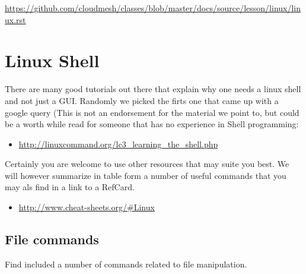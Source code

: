 \begin{fileremark}\url{https://github.com/cloudmesh/classes/blob/master/docs/source/lesson/linux/linux.rst}\end{fileremark}
\section{Linux Shell}\label{linux-shell}

There are many good tutorials out there that explain why one needs a
linux shell and not just a GUI. Randomly we picked the firts one that
came up with a google query (This is not an endorsement for the material
we point to, but could be a worth while read for someone that has no
experience in Shell programming:

\begin{itemize}
\tightlist
\item
  \url{http://linuxcommand.org/lc3_learning_the_shell.php}
\end{itemize}

Certainly you are welcome to use other resources that may suite you
best. We will however summarize in table form a number of useful
commands that you may als find in a link to a RefCard.

\begin{itemize}
\tightlist
\item
  \url{http://www.cheat-sheets.org/\#Linux}
\end{itemize}

\subsection{File commands}\label{file-commands}

Find included a number of commands related to file manipulation.

